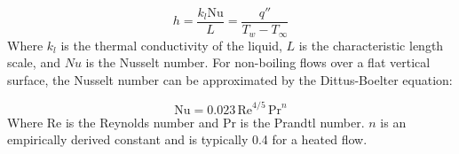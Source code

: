 \begin{equation}
h = \frac{k_l \mathrm{Nu}}{L} = \frac{q''}{T_w-T_{\infty}}
\label{eq:htc}
\end{equation}
Where $k_l$ is the thermal conductivity of the liquid, $L$ is the characteristic length scale, and $Nu$ is the Nusselt number.  For non-boiling flows over a flat vertical surface, the Nusselt number can be approximated by the
Dittus-Boelter equation:

\begin{equation}
\mathrm{Nu} = 0.023\, \mathrm{Re}^{4/5}\, \mathrm{Pr}^{n}
\label{eq:db}
\end{equation} 
Where $\mathrm{Re}$ is the Reynolds number and $\mathrm{Pr}$ is the Prandtl number.  $n$ is an empirically derived constant and is typically 0.4 for a heated flow.
